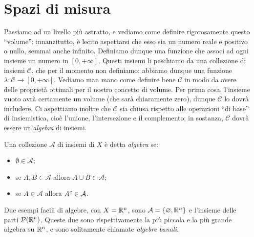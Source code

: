\section{Spazi di misura}
Passiamo ad un livello più astratto, e vediamo come definire rigorosamente questo ``volume'': innanzitutto, è lecito aspettarsi che esso sia un numero reale e positivo o nullo, semmai anche infinito.
Definiamo dunque una funzione che associ ad ogni insieme un numero in $[0,+\infty]$.
Questi insiemi li peschiamo da una collezione di insiemi $\mathcal C$, che per il momento non definiamo: abbiamo dunque una funzione $\lambda\colon\mathcal C\to[0,+\infty]$.
Vediamo man mano come definire bene $\mathcal C$ in modo da avere delle proprietà ottimali per il nostro concetto di volume.
Per prima cosa, l'insieme vuoto avrà certamente un volume (che sarà chiaramente zero), dunque $\mathcal C$ lo dovrà includere.
Ci aspettiamo inoltre che $\mathcal C$ sia chiusa rispetto alle operazioni ``di base'' di insiemistica, cioè l'unione, l'intersezione e il complemento; in sostanza, $\mathcal C$ dovrà essere un'\emph{algebra} di insiemi.
\begin{definizione} \label{d:algebra}
	Una collezione $\mathcal A$ di insiemi di $X$ è detta \emph{algebra} se:
	\begin{itemize}
		\item $\emptyset\in\mathcal A$;
		\item se $A,B\in\mathcal A$ allora $A\cup B\in\mathcal A$;
		\item se $A\in\mathcal A$ allora ${A}^c\in\mathcal A$.
	\end{itemize}
\end{definizione}
Due esempi facili di algebre, con $X=\mathbb{R}^n$, sono $\mathcal A=\{\varnothing,\mathbb{R}^n\}$ e l'insieme delle parti $\mathcal P(\mathbb{R}^n)$.
Queste due sono rispettivamente la più piccola e la più grande algebra su $\mathbb{R}^n$, e sono solitamente chiamate \emph{algebre banali}.

